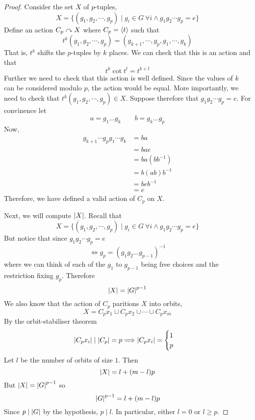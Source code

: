 \documentclass{article}
\begin{document}
\begin{proof}
    Consider the set $X$ of $p$-tuples,
    \[
        X = \{(g_1, g_2, \cdots, g_p) \mid g_i \in G \ \forall i \wedge g_1g_2\cdots g_p = e\}
    \]
    Define an action $C_p \curvearrowright X$ where $C_p = \left\langle t\right\rangle$ such that
    \[
        t^k (g_1, g_2, \cdots, g_p) = (g_{k+1}, \cdots, g_p, g_1, \cdots, g_{k})  
    \]
    That is, $t^k$ shifts the $p$-tuples by $k$ places. We can check that this is an action and that
    \[
        t^k \cot t^l = t^{k + l} 
    \]
    Further we need to check that this action is well defined. Since the values of $k$ can be considered modulo $p$, the action would be equal. More importantly, we need to check that $t^k(g_1, g_2, \cdots, g_p) \in X$.
    Suppose therefore that $g_1g_2\cdots g_p = e$. For convinence let
    \[
        a = g_1\ldots g_k \qquad b = g_k\ldots g_p
    \]
    Now, 
    \begin{align*}
        g_{k+1}\cdots g_{p} g_1 \cdots g_k &= ba \\
        &= bae \\
        &= ba(b b^{-1}) \\
        &= b (ab) b^{-1} \\
        &= b e b^{-1} \\
        &= e
    \end{align*}
    Therefore, we have defined a valid action of $C_p$ on $X$.

    Next, we will compute $\left\lvert X\right\rvert$. Recall that
    \[
        X = \{(g_1, g_2, \cdots, g_p) \mid g_i \in G \ \forall i \wedge g_1g_2\cdots g_p = e\}
    \]
    But notice that since $g_1g_2\cdots g_p = e$
    \[
        \Leftrightarrow g_p = (g_1 g_2 \ldots g_{p-1})^{-1}    
    \]
    where we can think of each of the $g_1$ to $g_{p-1}$ being free choices and the restriction fixing $g_p$. Therefore
    \[
        \left\lvert X\right\rvert = \left\lvert G\right\rvert^{p-1}  
    \]
    We also know that the action of $C_p$ paritions $X$ into orbits,
    \[
        X = C_px_1 \cup C_px_2 \cup \cdots \cup C_px_m
    \]
    By the orbit-stabiliser theorem
    \[
        \left\lvert C_px_i\right\rvert \mid \left\lvert C_p\right\rvert = p \Longrightarrow \left\lvert C_px_i\right\rvert = \begin{cases}
            1 \\ 
            p
        \end{cases}
    \]
    Let $l$ be the number of orbits of size $1$. Then
    \[
        \left\lvert X\right\rvert = l + (m-l)p
    \]
    But $\left\lvert X\right\rvert = \left\lvert G\right\rvert^{p-1}$ so
    \[
        \left\lvert G\right\rvert^{p-1} = l + (m-l)p
    \]
    Since $p \mid \left\lvert G\right\rvert$ by the hypothesis, $p \mid l$. In particular, either $l = 0$ or $l \geq p$.


\end{proof}
\end{document}
